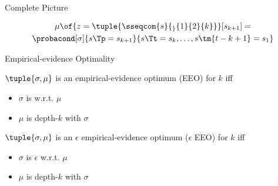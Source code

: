 \begin{frame}{Complete Picture}
\begin{multline*}
  \mu\of{z = \tuple{\sseqcom{s}{_}{1}{2}{k}}}[s_{k+1}] = \\
  \probacond[\sigma]{s\Tp = s_{k+1}}{s\Tt=s_{k}, \dots, s \tm{t -k + 1} = s_{1}}
\end{multline*}
\end{frame}
\begin{frame}{Empirical-evidence Optimality}
  \begin{definition}
  \(\tuple{\sigma, \mu}\) is an empirical-evidence optimum (EEO) for \(k\) iff
  \begin{itemize}
  \item \(\sigma\) is  w.r.t. \(\mu\)
  \item \(\mu\) is depth-\(k\)  with \(\sigma\)
  \end{itemize}
  \end{definition}
\bigskip
  \begin{definition}
  \(\tuple{\sigma, \mu}\) is an \alert{\(\epsilon\)} empirical-evidence optimum (\alert{\(\epsilon\)} EEO) for \(k\) iff
  \begin{itemize}
  \item \(\sigma\) is \alert{\(\epsilon\)}  w.r.t. \(\mu\)
  \item \(\mu\) is depth-\(k\)  with \(\sigma\)
  \end{itemize}
  \end{definition}
\end{frame}
